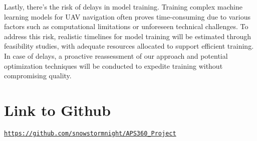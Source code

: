 \documentclass{article} %
\begin{document}
Lastly, there's the risk of delays in model training. Training complex machine learning models for UAV navigation often proves time-consuming due to various factors such as computational limitations or unforeseen technical challenges. To address this risk, realistic timelines for model training will be estimated through feasibility studies, with adequate resources allocated to support efficient training. In case of delays, a proactive reassessment of our approach and potential optimization techniques will be conducted to expedite training without compromising quality.




\section{Link to Github}

\texttt{\href{https://github.com/snowstormnight/APS360_Project}{https://github.com/snowstormnight/APS360{\_}Project}}






\label{last_page}




\end{document}
